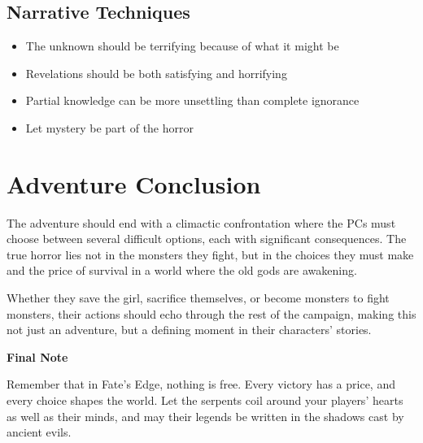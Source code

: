 \documentclass[12pt,twoside]{article}
\newenvironment{adventurebox}[1]{
  \begin{mdframed}[
    linewidth=2pt,
    linecolor=serpentgreen,
    backgroundcolor=gray!10,
    innertopmargin=10pt,
    innerbottommargin=10pt,
    innerrightmargin=10pt,
    innerleftmargin=10pt
  ]
  \textbf{#1}
}{\end{mdframed}}
\begin{document}
\subsection{Narrative Techniques}

\begin{itemize}
  \item The unknown should be terrifying because of what it might be
  \item Revelations should be both satisfying and horrifying
  \item Partial knowledge can be more unsettling than complete ignorance
  \item Let mystery be part of the horror
\end{itemize}

\section{Adventure Conclusion}

The adventure should end with a climactic confrontation where the PCs must choose between several difficult options, each with significant consequences. The true horror lies not in the monsters they fight, but in the choices they must make and the price of survival in a world where the old gods are awakening.

Whether they save the girl, sacrifice themselves, or become monsters to fight monsters, their actions should echo through the rest of the campaign, making this not just an adventure, but a defining moment in their characters' stories.

\begin{adventurebox}{Final Note}
Remember that in Fate's Edge, nothing is free. Every victory has a price, and every choice shapes the world. Let the serpents coil around your players' hearts as well as their minds, and may their legends be written in the shadows cast by ancient evils.
\end{adventurebox}
\end{document}
